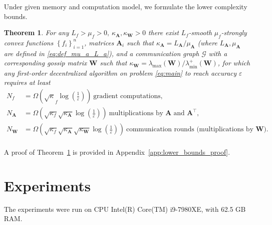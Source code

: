 \documentclass{article}
\newtheorem{theorem}{Theorem}
\newcommand{\cG}{\mathcal{G}}
\newcommand{\mA}{\mathbf{A}}
\newcommand{\mW}{\mathbf{W}}
\newcommand{\cbraces}[1]{\left( #1 \right)}
\newcommand{\braces}[1]{\left\{ #1 \right\}}
\newcommand{\eps}{\varepsilon}
\begin{document}
Under given memory and computation model, we formulate the lower complexity bounds.
\begin{theorem}\label{thm:lower_bounds}
	For any $L_f > \mu_f > 0,~ \kappa_\mA, \kappa_\mW > 0$ there exist $L_f$-smooth $\mu_f$-strongly convex functions $\braces{f_i}_{i=1}^n$, matrices $\mA_i$ such that $\kappa_\mA = L_\mA / \mu_\mA$ (where $L_\mA, \mu_\mA$ are defined in \eqref{eq:def_mu_a_L_a}), and a communication graph $\cG$ with a corresponding gossip matrix $\mW$ such that $\kappa_\mW = \lambda_{\max}(\mW) / \lambda_{\min}^+(\mW)$, for which any first-order decentralized algorithm on problem \eqref{eq:main} to reach accuracy $\eps$ requires at least
	\begin{align*}
		N_f &= \Omega\cbraces{\sqrt\kappa_f \log\cbraces{\frac{1}{\eps}}}~ \text{gradient computations}, \\
		N_{\mA} &= \Omega\cbraces{\sqrt{\kappa_f}\sqrt{\kappa_\mA}\log\cbraces{\frac{1}{\eps}}}~ \text{multiplications by $\mA$ and $\mA^\top$}, \\
		N_{\mW} &= \Omega\cbraces{\sqrt{\kappa_f}\sqrt{\kappa_\mA}\sqrt{\kappa_\mW}\log\cbraces{\frac{1}{\eps}}}~ \text{communication rounds (multiplications by $\mW$)}.  \\
	\end{align*}
\end{theorem}
A proof of Theorem~\ref{thm:lower_bounds} is provided in Appendix~\ref{app:lower_bounds_proof}.


\section{Experiments}\label{sec:experiments}
The experiments were run on CPU Intel(R) Core(TM) i9-7980XE, with 62.5 GB RAM.
\end{document}
